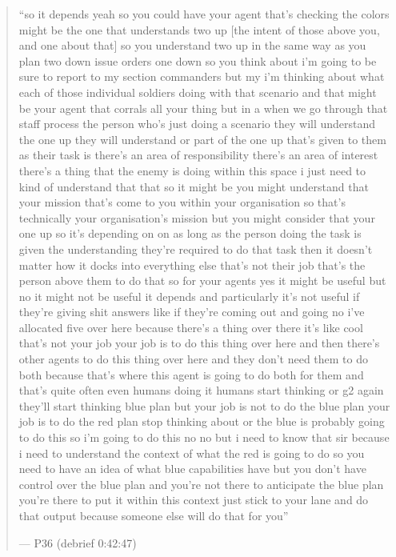 \begin{quote}
``so it depends yeah so you could have your agent that's checking the colors might be the one that understands two up [the intent of those above you, and one about that] so you understand two up in the same way as you plan two down issue orders one down so you think about i'm going to be sure to report to my section commanders but my i'm thinking about what each of those individual soldiers doing with that scenario and that might be your agent that corrals all your thing but in a when we go through that staff process the person who's just doing a scenario they will understand the one up they will understand or part of the one up that's given to them as their task is there's an area of responsibility there's an area of interest there's a thing that the enemy is doing within this space i just need to kind of understand that that so it might be you might understand that your mission that's come to you within your organisation so that's technically your organisation's mission but you might consider that your one up so it's depending on on as long as the person doing the task is given the understanding they're required to do that task then it doesn't matter how it docks into everything else that's not their job that's the person above them to do that so for your agents yes it might be useful but no it might not be useful it depends and particularly it's not useful if they're giving shit answers like if they're coming out and going no i've allocated five over here because there's a thing over there it's like cool that's not your job your job is to do this thing over here and then there's other agents to do this thing over here and they don't need them to do both because that's where this agent is going to do both for them and that's quite often even humans doing it humans start thinking or g2 again they'll start thinking blue plan but your job is not to do the blue plan your job is to do the red plan stop thinking about or the blue is probably going to do this so i'm going to do this no no but i need to know that sir because i need to understand the context of what the red is going to do so you need to have an idea of what blue capabilities have but you don't have control over the blue plan and you're not there to anticipate the blue plan you're there to put it within this context just stick to your lane and do that output because someone else will do that for you''\par\hfill--- P36 (debrief 0:42:47)
\end{quote}

